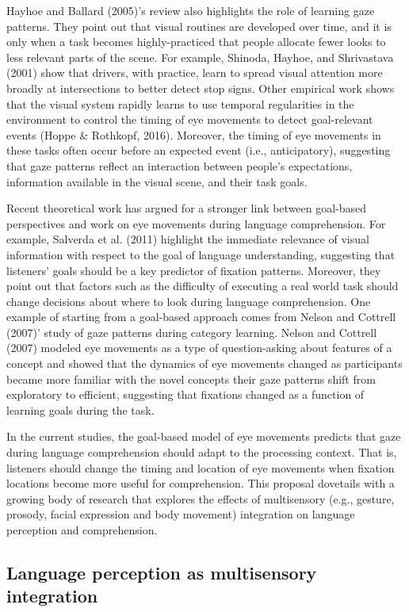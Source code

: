 \documentclass[english,floatsintext,man]{apa6}
\begin{document}
Hayhoe and Ballard (2005)'s review also highlights the role of learning
gaze patterns. They point out that visual routines are developed over
time, and it is only when a task becomes highly-practiced that people
allocate fewer looks to less relevant parts of the scene. For example,
Shinoda, Hayhoe, and Shrivastava (2001) show that drivers, with
practice, learn to spread visual attention more broadly at intersections
to better detect stop signs. Other empirical work shows that the visual
system rapidly learns to use temporal regularities in the environment to
control the timing of eye movements to detect goal-relevant events
(Hoppe \& Rothkopf, 2016). Moreover, the timing of eye movements in
these tasks often occur before an expected event (i.e., anticipatory),
suggesting that gaze patterns reflect an interaction between people's
expectations, information available in the visual scene, and their task
goals.

Recent theoretical work has argued for a stronger link between
goal-based perspectives and work on eye movements during language
comprehension. For example, Salverda et al. (2011) highlight the
immediate relevance of visual information with respect to the goal of
language understanding, suggesting that listeners' goals should be a key
predictor of fixation patterns. Moreover, they point out that factors
such as the difficulty of executing a real world task should change
decisions about where to look during language comprehension. One example
of starting from a goal-based approach comes from Nelson and Cottrell
(2007)' study of gaze patterns during category learning. Nelson and
Cottrell (2007) modeled eye movements as a type of question-asking about
features of a concept and showed that the dynamics of eye movements
changed as participants became more familiar with the novel concepts
their gaze patterns shift from exploratory to efficient, suggesting that
fixations changed as a function of learning goals during the task.

In the current studies, the goal-based model of eye movements predicts
that gaze during language comprehension should adapt to the processing
context. That is, listeners should change the timing and location of eye
movements when fixation locations become more useful for comprehension.
This proposal dovetails with a growing body of research that explores
the effects of multisensory (e.g., gesture, prosody, facial expression
and body movement) integration on language perception and comprehension.

\hypertarget{language-perception-as-multisensory-integration}{%
\subsection{Language perception as multisensory
integration}\label{language-perception-as-multisensory-integration}}
\end{document}
